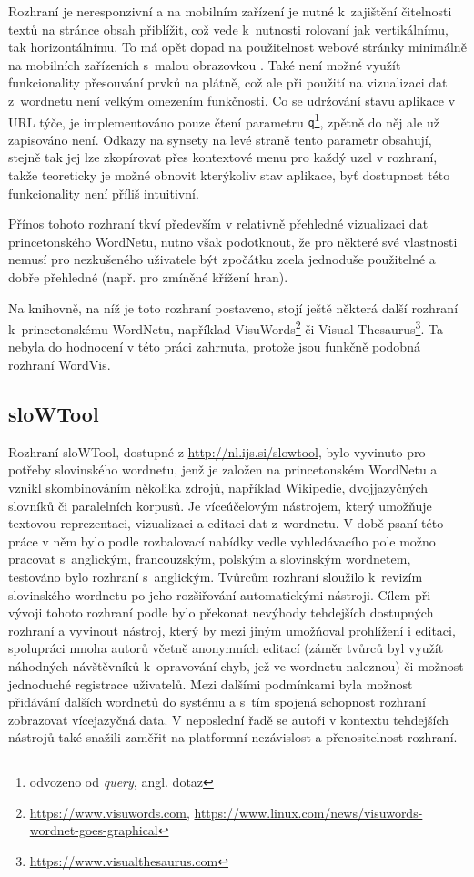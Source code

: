 \documentclass[a4paper, 11pt, oneside, showtrims]{book}
\begin{document}
					Rozhraní je neresponzivní a na mobilním zařízení je nutné k~zajištění čitelnosti textů na stránce obsah přiblížit, což vede k~nutnosti rolovaní jak vertikálnímu, tak horizontálnímu. To má opět dopad na použitelnost webové stránky minimálně na mobilních zařízeních s~malou obrazovkou \parencite{nn2005scrollbar, richards2004web}. Také není možné využít funkcionality přesouvání prvků na plátně, což ale při použití na vizualizaci dat z~wordnetu není velkým omezením funkčnosti. Co se udržování stavu aplikace v URL týče, je implementováno pouze čtení parametru {\tt q}\footnote{odvozeno od \textit{query}, angl. dotaz}, zpětně do něj ale už zapisováno není. Odkazy na synsety na levé straně tento parametr obsahují, stejně tak jej lze zkopírovat přes kontextové menu pro každý uzel v rozhraní, takže teoreticky je možné obnovit kterýkoliv stav aplikace, byť dostupnost této funkcionality není příliš intuitivní.

					Přínos tohoto rozhraní tkví především v relativně přehledné vizualizaci dat princetonského WordNetu, nutno však podotknout, že pro některé své vlastnosti nemusí pro nezkušeného uživatele být zpočátku zcela jednoduše použitelné a dobře přehledné (např. pro zmíněné křížení hran).

					Na knihovně, na níž je toto rozhraní postaveno, stojí ještě některá další rozhraní k~princetonskému WordNetu, například VisuWords\footnote{\url{https://www.visuwords.com}, \url{https://www.linux.com/news/visuwords-wordnet-goes-graphical}} či Visual Thesaurus\footnote{\url{https://www.visualthesaurus.com}}. Ta nebyla do hodnocení v této práci zahrnuta, protože jsou funkčně podobná rozhraní WordVis.

				\subsection{sloWTool}
				\label{vis:slowtool}

					Rozhraní sloWTool, dostupné z \url{http://nl.ijs.si/slowtool}, bylo vyvinuto pro potřeby slovinského wordnetu, jenž je založen na princetonském WordNetu a vznikl skombinováním několika zdrojů, například Wikipedie, dvojjazyčných slovníků či paralelních korpusů. Je víceúčelovým nástrojem, který umožňuje textovou reprezentaci, vizualizaci a editaci dat z~wordnetu. V době psaní této práce v něm bylo podle rozbalovací nabídky vedle vyhledávacího pole možno pracovat s~anglickým, francouzským, polským a slovinským wordnetem, testováno bylo rozhraní s~anglickým. Tvůrcům rozhraní sloužilo k~revizím slovinského wordnetu po jeho rozšiřování automatickými nástroji. \parencite{fivser2012slownet} Cílem při vývoji tohoto rozhraní podle \textcite{fivser2011visualizing} bylo překonat nevýhody tehdejších dostupných rozhraní a vyvinout nástroj, který by mezi jiným umožňoval prohlížení i editaci, spolupráci mnoha autorů včetně anonymních editací (záměr tvůrců byl využít náhodných návštěvníků k~opravování chyb, jež ve wordnetu naleznou) či možnost jednoduché registrace uživatelů. Mezi dalšími podmínkami byla možnost přidávání dalších wordnetů do systému a s~tím spojená schopnost rozhraní zobrazovat vícejazyčná data. V neposlední řadě se autoři v kontextu tehdejších nástrojů také snažili zaměřit na platformní nezávislost a přenositelnost rozhraní. 
\end{document}

